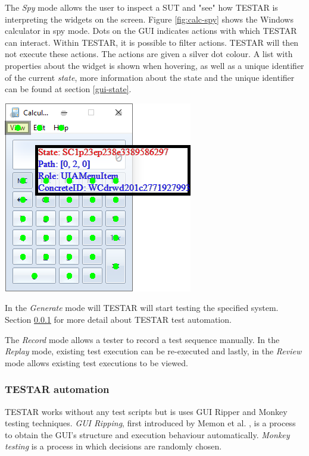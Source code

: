 The \emph{Spy} mode allows the user to inspect a SUT and "see" how TESTAR is interpreting the widgets on the screen. Figure \ref{fig:calc-spy} shows the Windows calculator in spy mode. Dots on the GUI indicates actions with which TESTAR can interact. Within TESTAR, it is possible to filter actions. TESTAR will then not execute these actions. The actions are given a silver dot colour. A list with properties about the widget is shown when hovering, as well as a unique identifier of the current \emph{state}, more information about the state and the unique identifier can be found at section \ref{gui-state}.\par

\begingroup
\captionsetup{type=figure}
\includegraphics{pics/calc-state.png}
\label{fig:calc-spy}
\endgroup

In the \emph{Generate} mode will TESTAR will start testing the specified system. Section \ref{testar-testauto} for more detail about TESTAR test automation.

The \emph{Record} mode allows a tester to record a test sequence manually. In the \emph{Replay} mode, existing test execution can be re-executed and lastly, in the \emph{Review} mode allows existing test executions to be viewed.

\subsubsection{TESTAR automation} \label{testar-testauto}
    
TESTAR works without any test scripts but is uses GUI Ripper and Monkey testing techniques. \emph{GUI Ripping}, first introduced by Memon et al. \cite{gui-ripping}, is a process to obtain the GUI's structure and execution behaviour automatically. \emph{Monkey testing} is a process in which decisions are randomly chosen. 

